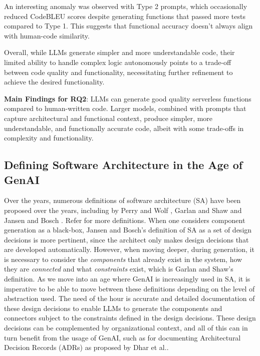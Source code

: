 An interesting anomaly was observed with Type 2 prompts, which occasionally reduced CodeBLEU scores despite generating functions that passed more tests compared to Type 1. This suggests that functional accuracy doesn’t always align with human-code similarity. 

Overall, while LLMs generate simpler and more understandable code, their limited ability to handle complex logic autonomously points to a trade-off between code quality and functionality, necessitating further refinement to achieve the desired functionality.

\begin{tcolorbox}[colback=orange!5!white, colframe=orange!95!white, colbacktitle=orange!95!white]
\small
    \textbf{Main Findings for RQ2}: LLMs can generate good quality serverless functions compared to human-written code. Larger models, combined with prompts that capture architectural and functional context, produce simpler, more understandable, and functionally accurate code, albeit with some trade-offs in complexity and functionality.
\end{tcolorbox}

\subsection{Defining Software Architecture in the Age of GenAI}
Over the years, numerous definitions of software architecture (SA) have been proposed over the years, including by Perry and Wolf \cite{perrywolf_architecture}, Garlan and Shaw \cite{garlan1993_component_connector} and Jansen and Bosch \cite{bosch_designdecisions}.
Refer \cite{What_is_your_definition_of_software_architecture_2010} for more definitions.
When one considers component generation as a black-box, Jansen and Bosch's definition of SA as a set of design decisions \cite{bosch_designdecisions} is more pertinent, since the architect only makes design decisions that are developed automatically.
However, when moving deeper, during generation, it is necessary to consider the \textit{components} that already exist in the system, how they are \textit{connected} and what \textit{constraints} exist, which is Garlan and Shaw's definition\cite{garlan1993_component_connector}. As we move into an age where GenAI is increasingly used in SA, it is imperative to be able to move between these definitions depending on the level of abstraction used.
The need of the hour is accurate and detailed documentation of these design decisions to enable LLMs to generate the components and connectors subject to the constraints defined in the design decisions. These design decisions can be complemented by organizational context, and all of this can in turn benefit from the usage of GenAI, such as for documenting Architectural Decision Records (ADRs) as proposed by Dhar et al.\cite{dhar_adr}.

